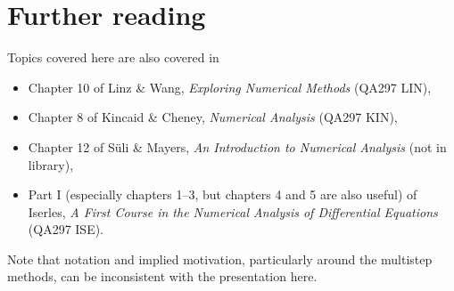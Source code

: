 \section*{Further reading}

Topics covered here are also covered in
\begin{itemize}
\item Chapter 10 of Linz \& Wang, \textit{Exploring Numerical Methods}
  (QA297 LIN),
\item Chapter 8 of Kincaid \& Cheney, \textit{Numerical Analysis}
  (QA297 KIN),
\item Chapter 12 of S{\"u}li \& Mayers, \textit{An Introduction to
    Numerical Analysis} (not in library),
\item Part I (especially chapters 1--3, but chapters 4 and 5 are also
  useful) of Iserles, \textit{A First Course in the Numerical Analysis
    of Differential Equations} (QA297 ISE).
\end{itemize}
Note that notation and implied motivation, particularly around the
multistep methods, can be inconsistent with the presentation here.